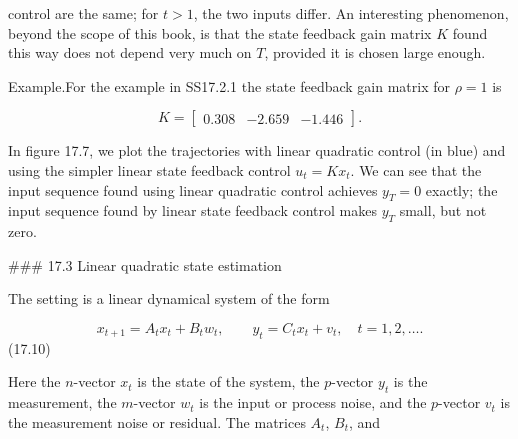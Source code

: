 control are the same; for \(t>1\), the two inputs differ. An interesting phenomenon, beyond the scope of this book, is that the state feedback gain matrix \(K\) found this way does not depend very much on \(T\), provided it is chosen large enough.

Example.For the example in SS17.2.1 the state feedback gain matrix for \(\rho=1\) is

\[K=\left[\begin{array}{cc}0.308&-2.659&-1.446\end{array}\right].\]

In figure 17.7, we plot the trajectories with linear quadratic control (in blue) and using the simpler linear state feedback control \(u_{t}=Kx_{t}\). We can see that the input sequence found using linear quadratic control achieves \(y_{T}=0\) exactly; the input sequence found by linear state feedback control makes \(y_{T}\) small, but not zero.

### 17.3 Linear quadratic state estimation

The setting is a linear dynamical system of the form

\[x_{t+1}=A_{t}x_{t}+B_{t}w_{t},\qquad y_{t}=C_{t}x_{t}+v_{t},\quad t=1,2,\ldots.\] (17.10)

Here the \(n\)-vector \(x_{t}\) is the state of the system, the \(p\)-vector \(y_{t}\) is the measurement, the \(m\)-vector \(w_{t}\) is the input or process noise, and the \(p\)-vector \(v_{t}\) is the measurement noise or residual. The matrices \(A_{t}\), \(B_{t}\), and 